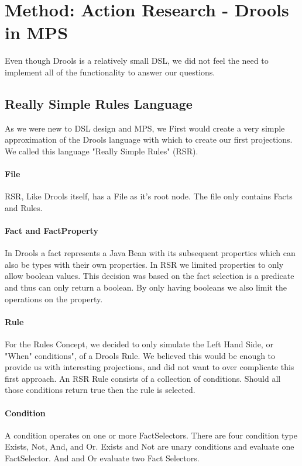 \section{Method: Action Research - Drools in MPS}\label{section:Method_action_research}

Even though Drools is a relatively small DSL, we did not feel the need to implement all of the functionality to answer our questions.

\subsection{Really Simple Rules Language}
As we were new to DSL design and MPS, we First would create a very simple approximation of the Drools language with which to create our first projections.
We called this language "Really Simple Rules" (RSR).

\paragraph{File} RSR, Like Drools itself, has a File as it's root node.
The file only contains Facts and Rules.

\paragraph{Fact and FactProperty} In Drools a fact represents a Java Bean with its subsequent properties which can also be types with their own properties.
In RSR we limited properties to only allow boolean values.
This decision was based on the fact selection is a predicate and thus can only return a boolean.
By only having booleans we also limit the operations on the property.

\paragraph{Rule} For the Rules Concept, we decided to only simulate the Left Hand Side, or "When" conditions", of a Drools Rule.
We believed this would be enough to provide us with interesting projections, and did not want to over complicate this first approach.
An RSR Rule consists of a collection of conditions. 
Should all those conditions return true then the rule is selected.

\paragraph{Condition} A condition operates on one or more FactSelectors.
There are four condition type Exists, Not, And, and Or.
Exists and Not are unary conditions and evaluate one FactSelector.
And and Or evaluate two Fact Selectors.


